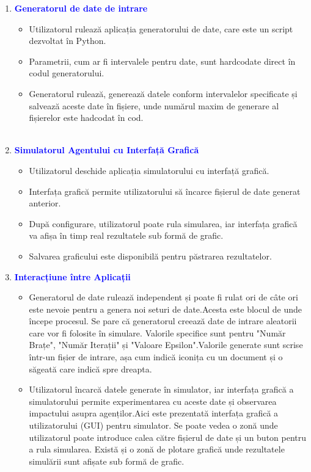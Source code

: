 \documentclass{article}
\begin{document}
\begin{enumerate}
    \item \textcolor{blue}{\textbf{Generatorul de date de intrare}}
    \begin{itemize}
        \item Utilizatorul rulează aplicația generatorului de date, care este un script dezvoltat în Python.
        \item Parametrii, cum ar fi intervalele pentru date, sunt hardcodate direct în codul generatorului.
        \item Generatorul rulează, generează datele conform intervalelor specificate și salvează aceste date în fișiere, unde numărul maxim de generare al fișierelor este hadcodat în cod.\\\\
    \end{itemize}
    \item \textcolor{blue}{\textbf{Simulatorul Agentului cu Interfață Grafică}}
    \begin{itemize}
        \item Utilizatorul deschide aplicația simulatorului cu interfață grafică.
        \item Interfața grafică permite utilizatorului să încarce fișierul de date generat anterior.
        \item După configurare, utilizatorul poate rula simularea, iar interfața grafică va afișa în timp real rezultatele sub formă de grafic.
        \item Salvarea graficului este disponibilă pentru păstrarea rezultatelor.\\
    \end{itemize}
    \item \textcolor{blue}{\textbf{Interacțiune între Aplicații}}
    \begin{itemize}
        \item Generatorul de date rulează independent și poate fi rulat ori de câte ori este nevoie pentru a genera noi seturi de date.Acesta este blocul de unde începe procesul. Se pare că generatorul creează date de intrare aleatorii care vor fi folosite în simulare. Valorile specifice sunt pentru "Număr Brațe", "Număr Iterații" și "Valoare Epsilon".Valorile generate sunt scrise într-un fișier de intrare, așa cum indică iconița cu un document și o săgeată care indică spre dreapta.
        \item Utilizatorul încarcă datele generate în simulator, iar interfața grafică a simulatorului permite experimentarea cu aceste date și observarea impactului asupra agenților.Aici este prezentată interfața grafică a utilizatorului (GUI) pentru simulator. Se poate vedea o zonă unde utilizatorul poate introduce calea către fișierul de date și un buton pentru a rula simularea. Există și o zonă de plotare grafică unde rezultatele simulării sunt afișate sub formă de grafic.

\end{itemize}
\end{enumerate}
\end{document}
